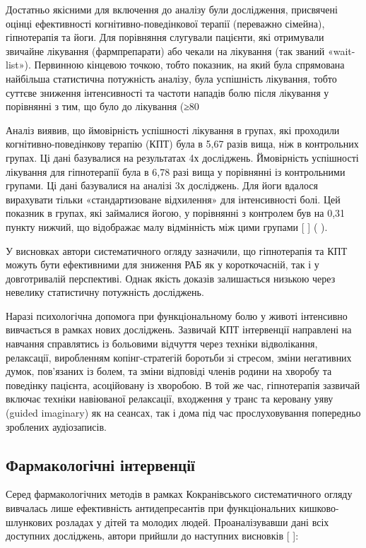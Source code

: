 Достатньо якісними для включення до аналізу були дослідження, присвячені оцінці ефективності когнітивно-поведінкової терапії (переважно сімейна), гіпнотерапія та йоги. Для порівняння слугували пацієнти, які отримували звичайне лікування (фармпрепарати) або чекали на лікування (так званий «wait-list»). Первинною кінцевою точкою, тобто показник, на який була спрямована найбільша статистична потужність аналізу, була успішність лікування, тобто суттєве зниження інтенсивності та частоти нападів болю після лікування у порівнянні з тим, що було до лікування (≥80%

Аналіз виявив, що ймовірність успішності лікування в групах, які проходили когнітивно-поведінкову терапію (КПТ) була в 5,67 разів вища, ніж в контрольних групах. Ці дані базувалися на результатах 4х досліджень. Ймовірність успішності лікування для гіпнотерапії була в 6,78 разі вища у порівнянні із контрольними групами. Ці дані базувалися на аналізі 3х досліджень. Для йоги вдалося вирахувати тільки «стандартизоване відхилення» для інтенсивності болі. Цей показник в групах, які займалися йогою, у порівнянні з контролем був на 0,31 пункту нижчий, що відображає малу відмінність між цими групами [
] (
).

У висновках автори систематичного огляду зазначили, що гіпнотерапія та КПТ можуть бути ефективними для зниження РАБ як у короткочасній, так і у довготривалій перспективі. Однак якість доказів залишається низькою через невелику статистичну потужність досліджень.

Наразі психологічна допомога при функціональному болю у животі інтенсивно вивчається в рамках нових досліджень. Зазвичай КПТ інтервенції направлені на навчання справлятись із больовими відчуття через техніки відволікання, релаксації, виробленням копінг-стратегій боротьби зі стресом, зміни негативних думок, пов’язаних із болем, та зміни відповіді членів родини на хворобу та поведінку пацієнта, асоційовану із хворобою. В той же час, гіпнотерапія зазвичай включає техніки навіюваної релаксації, входження у транс та керовану уяву (guided imaginary) як на сеансах, так і дома під час прослуховування попередньо зроблених аудіозаписів.

\subsection {Фармакологічні інтервенції}
Серед фармакологічних методів в рамках Кокранівського систематичного огляду вивчалась лише ефективність антидепресантів при функціональних кишково-шлункових розладах у дітей та молодих людей. Проаналізувавши дані всіх доступних досліджень, автори прийшли до наступних висновків [
]:

